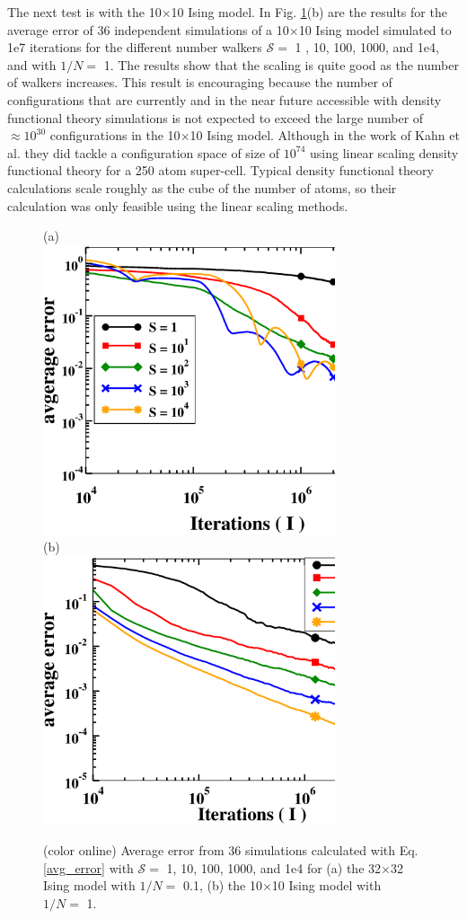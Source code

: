 \documentclass[aps,pre,reprint,superscriptaddress,showkeys]{revtex4-2}
\begin{document}
  The next test is with the 10$\times$10 Ising model. In Fig. \ref{thirtytwo_Stest}(b) are  the results for the average error of 36 independent simulations of a 10$\times$10 Ising model simulated to 1e7 iterations for the different number walkers $\mathcal{S}=$ 1 , 10, 100, 1000, and 1e4, and  with $1/N=$ 1. The results show that the scaling is quite good as the number of walkers increases. This result is encouraging because the number of configurations that are currently and in the near future accessible with density functional theory simulations is not expected to exceed the large number of $\approx 10^{30}$ configurations in the 10$\times$10 Ising model.  Although in the work of  Kahn et al. \cite{FP_Wang_Landau_CuZn} they did tackle a configuration space of size of $10^{74}$ using linear scaling density functional theory for a 250 atom super-cell. Typical density functional theory calculations scale roughly as the cube of the number of atoms, so their calculation was only feasible using the linear scaling methods.   
\begin{figure}[h!]
(a)\\
\includegraphics[width=8.6cm]{fig1a.eps}\\
(b)\\
\includegraphics[width=8.6cm]{fig1b.eps}
\caption{(color online) Average error from 36 simulations calculated with Eq. \ref{avg_error} with $\mathcal{S}=$ 1, 10, 100, 1000, and 1e4 for  (a) the 32$\times$32 Ising model with $1/N=$ 0.1, (b) the 10$\times$10 Ising model with $1/N =$ 1. \label{thirtytwo_Stest} }
\end{figure}
\end{document}

